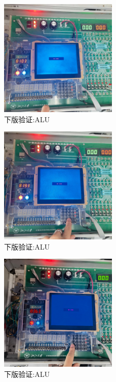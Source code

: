 \documentclass{article}
\begin{document}
    \begin{figure}[H]
    \centering
    \includegraphics[width=0.5\textwidth]{5.jpg}
    \caption{\label{Lab11}下版验证:ALU}
    \end{figure}

    \begin{figure}[H]
    \centering
    \includegraphics[width=0.5\textwidth]{6.jpg}
    \caption{\label{Lab11}下版验证:ALU}
    \end{figure}

    \begin{figure}[H]
    \centering
    \includegraphics[width=0.5\textwidth]{7.jpg}
    \caption{\label{Lab11}下版验证:ALU}
    \end{figure}
\end{document}
